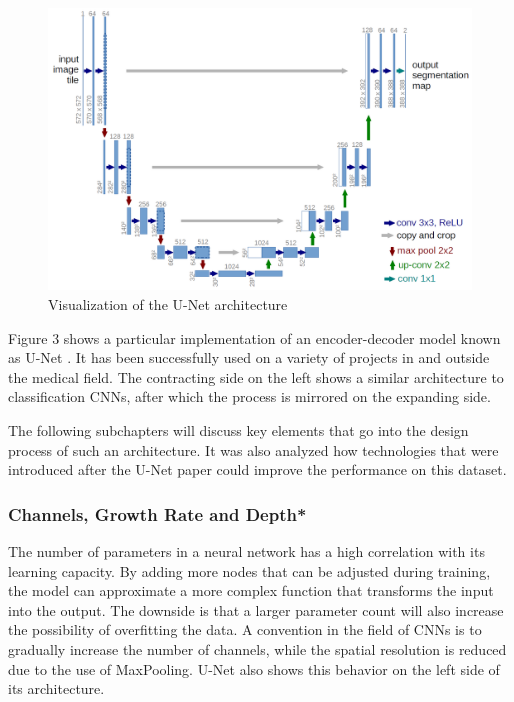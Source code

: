 \begin{figure}
\centering
\par
\includegraphics[width=1.0\textwidth]{imgs/unet.png}
\caption{Visualization of the U-Net architecture}
\par
\end{figure}

Figure 3 shows a particular implementation of an encoder-decoder model known as U-Net \cite{Ronneberger2015a}. It has been successfully used on a variety of projects in and outside the medical field. The contracting side on the left shows a similar architecture to classification CNNs, after which the process is mirrored on the expanding side.

The following subchapters will discuss key elements that go into the design process of such an architecture. It was also analyzed how technologies that were introduced after the U-Net paper could improve the performance on this dataset.

\subsubsection{Channels, Growth Rate and Depth*}

The number of parameters in a neural network has a high correlation with its learning capacity. By adding more nodes that can be adjusted during training, the model can approximate a more complex function that transforms the input into the output. The downside is that a larger parameter count will also increase the possibility of overfitting the data. A convention in the field of CNNs is to gradually increase the number of channels, while the spatial resolution is reduced due to the use of MaxPooling. U-Net also shows this behavior on the left side of its architecture.

